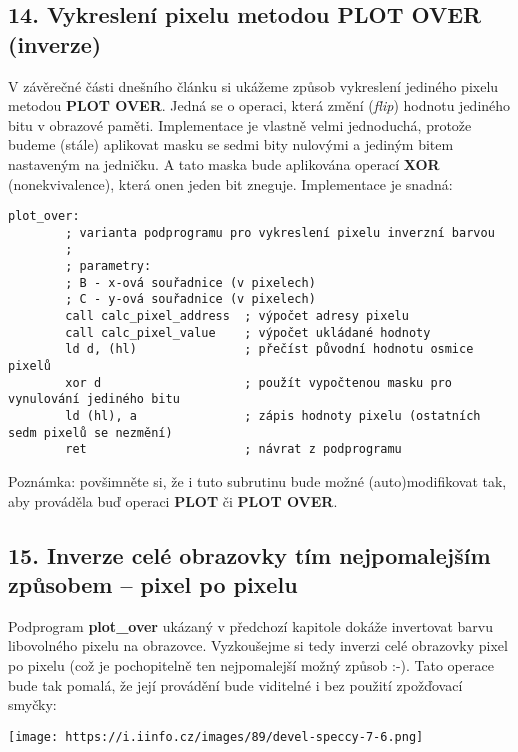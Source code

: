 \documentclass{article}
\renewcommand\includegraphics[2][]{}
\begin{document}
\hypertarget{k14}{%
\subsection{\texorpdfstring{14. Vykreslení pixelu metodou \textbf{PLOT
OVER}
(inverze)}{14. Vykreslení pixelu metodou PLOT OVER (inverze)}}\label{k14}}

V závěrečné části dnešního článku si ukážeme způsob vykreslení jediného
pixelu metodou \textbf{PLOT OVER}. Jedná se o operaci, která změní
(\emph{flip}) hodnotu jediného bitu v obrazové paměti. Implementace je
vlastně velmi jednoduchá, protože budeme (stále) aplikovat masku se
sedmi bity nulovými a jediným bitem nastaveným na jedničku. A tato maska
bude aplikována operací \textbf{XOR} (nonekvivalence), která onen jeden
bit zneguje. Implementace je snadná:

\begin{verbatim}
plot_over:
        ; varianta podprogramu pro vykreslení pixelu inverzní barvou
        ;
        ; parametry:
        ; B - x-ová souřadnice (v pixelech)
        ; C - y-ová souřadnice (v pixelech)
        call calc_pixel_address  ; výpočet adresy pixelu
        call calc_pixel_value    ; výpočet ukládané hodnoty
        ld d, (hl)               ; přečíst původní hodnotu osmice pixelů
        xor d                    ; použít vypočtenou masku pro vynulování jediného bitu
        ld (hl), a               ; zápis hodnoty pixelu (ostatních sedm pixelů se nezmění)
        ret                      ; návrat z podprogramu
\end{verbatim}

Poznámka: povšimněte si, že i tuto subrutinu bude možné
(auto)modifikovat tak, aby prováděla buď operaci \textbf{PLOT} či
\textbf{PLOT OVER}.

\hypertarget{k15}{%
\subsection{15. Inverze celé obrazovky tím nejpomalejším způsobem --
pixel po pixelu}\label{k15}}

Podprogram \textbf{plot\_over} ukázaný v předchozí kapitole dokáže
invertovat barvu libovolného pixelu na obrazovce. Vyzkoušejme si tedy
inverzi celé obrazovky pixel po pixelu (což je pochopitelně ten
nejpomalejší možný způsob :-). Tato operace bude tak pomalá, že její
provádění bude viditelné i bez použití zpožďovací smyčky:

\texttt{[image: https://i.iinfo.cz/images/89/devel-speccy-7-6.png]}
\end{document}
